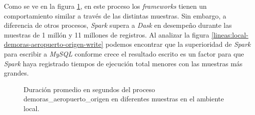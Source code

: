 Como se ve en la figura \ref{lineas:local-demoras-aeropuerto-origen}, en este proceso los \textit{frameworks} tienen un comportamiento similar a través de las distintas muestras. Sin embargo, a diferencia de otros procesos, \textit{Spark} supera a \textit{Dask} en desempeño durante las muestras de 1 millón y 11 millones de registros. Al analizar la figura \ref{lineas:local-demoras-aeropuerto-origen-write} podemos encontrar que la superioridad de \textit{Spark} para escribir a \textit{MySQL} conforme crece el resultado escrito es un factor para que \textit{Spark} haya registrado tiempos de ejecución total menores con las muestras más grandes. 

\begin{figure}
\centering
{}
\caption{Duración promedio en segundos del proceso demoras\_aeropuerto\_origen en diferentes muestras en el ambiente local.}
\label{lineas:local-demoras-aeropuerto-origen}
\end{figure}

